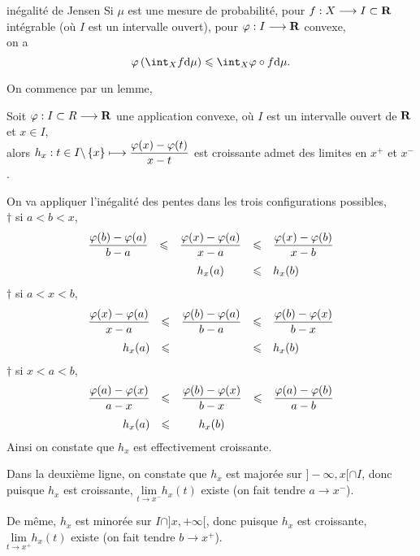 \documentclass[a4paper,11pt, twoside]{article}
\begin{document}
\begin{propC}{inégalité de Jensen}
  Si $\mu$ est une mesure de probabilité, pour $f:X\longrightarrow I\subset \mathbf R$ intégrable (où $I$ est un intervalle ouvert), pour $\varphi:I\longrightarrow\mathbf R$ convexe,\\

  on a 
  $$\varphi\Par{\int_Xf\mathrm d\mu}\leqslant \int_X\varphi\circ f\mathrm d\mu.$$
\end{propC}


On commence par un lemme,


\begin{lemme}
  Soit $\varphi:I\subset R\longrightarrow\mathbf R$ une application convexe, où $I$ est un intervalle ouvert de $\mathbf R$ et $x\in I$,\\

  alors $h_x:t\in I\backslash\left\{x\right\}\longmapsto\displaystyle\frac{\varphi(x)-\varphi(t)}{x-t}$ est croissante admet des limites en $x^+$ et $x^-$.
\end{lemme}


\begin{Proof}
  On va appliquer l'inégalité des pentes dans les trois configurations possibles,\\
  $\dagger$ si $a<b<x$,
  $$\begin{array}{rcccl}
    \displaystyle\frac{\varphi(b)-\varphi(a)}{b-a}&\leqslant&\displaystyle\frac{\varphi(x)-\varphi(a)}{x-a}&\leqslant& \displaystyle\frac{\varphi(x)-\varphi(b)}{x-b}\\[1.1em]
    &&h_x(a)&\leqslant& h_x(b)
  \end{array}$$
  $\dagger$ si $a<x<b$,
  $$\begin{array}{rcccl}
    \displaystyle\frac{\varphi(x)-\varphi(a)}{x-a}&\leqslant&\displaystyle\frac{\varphi(b)-\varphi(a)}{b-a}&\leqslant& \displaystyle\frac{\varphi(b)-\varphi(x)}{b-x}\\[1.1em]
    h_x(a)&\leqslant& &\leqslant& h_x(b)
  \end{array}$$
  $\dagger$ si $x<a<b$,
  $$\begin{array}{rcccl}
    \displaystyle\frac{\varphi(a)-\varphi(x)}{a-x}&\leqslant&\displaystyle\frac{\varphi(b)-\varphi(x)}{b-x}&\leqslant&\displaystyle\frac{\varphi(a)-\varphi(b)}{a-b}\\[1.1em]
  h_x(a)&\leqslant&h_x(b)&&
  \end{array}$$
  Ainsi on constate que $h_x$ est effectivement croissante.

  Dans la deuxième ligne, on constate que $h_x$ est majorée sur $]-\infty,x[\cap I$, donc puisque $h_x$ est croissante, $\underset{t\to x^-}{\mathrm{lim}}h_x(t)$ existe (on fait tendre $a\to x^-$).

  De même, $h_x$ est minorée sur $I\cap]x,+\infty[$, donc puisque $h_x$ est croissante, $\underset{t\to x^+}{\mathrm{lim}}h_x(t)$ existe (on fait tendre $b\to x^+$).
\end{Proof}
\end{document}
